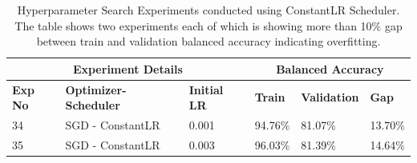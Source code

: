 \documentclass{report} %
\begin{document}
\begin{table}[]
\caption[Hyperparameter Search Experiments conducted using ConstantLR Scheduler]{Hyperparameter Search Experiments conducted using ConstantLR Scheduler. The table shows two experiments each of which is showing more than 10\% gap between train and validation balanced accuracy indicating overfitting.}
\label{table:constantlr-performance}
\begin{center}
\small
\begin{tabular}{llllll}
\multicolumn{3}{c}{\bf{Experiment Details}} & \multicolumn{3}{c}{\bf{Balanced Accuracy}} \\
\hline
\bf{Exp No} & \bf{Optimizer-Scheduler} & \bf{Initial LR} & \bf{Train} & \bf{Validation} & \bf{Gap} \\
\hline
34 & SGD - ConstantLR & 0.001 & 94.76\% & 81.07\% & 13.70\% \\
35 & SGD - ConstantLR & 0.003 & 96.03\% & 81.39\% & 14.64\% \\
\hline
\end{tabular}
\end{center}
\end{table}
\end{document}
